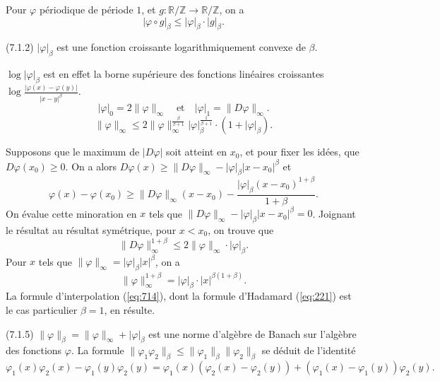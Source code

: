 \documentclass[12pt]{amsart}
\theoremstyle{plain}
\theoremstyle{remark}
\begin{document}
Pour $\varphi$ p\'{e}riodique de p\'{e}riode $1$, et $g : \mathbb{R}/\mathbb{Z} \to \mathbb{R}/\mathbb{Z}$, on a
\begin{equation}\label{eq:711}
|\varphi \circ g|_{\beta} \leq |\varphi|_{\beta} \cdot |g|_{\beta} .
\end{equation}

(7.1.2) $|\varphi|_{\beta}$ est une fonction croissante logarithmiquement convexe de $\beta$.

$\log |\varphi|_{\beta}$ est en effet la borne sup\'{e}rieure des fonctions lin\'{e}aires croissantes $\log \frac{|\varphi(x) - \varphi(y)|}{|x-y|^{\beta}}$.
\begin{equation}\label{eq:713}
|\varphi|_{0} = 2\|\varphi\|_{\infty} \quad \text{et} \quad |\varphi|_{1} = \|D\varphi\|_{\infty} .
\end{equation}
\begin{equation}\label{eq:714}
\|\varphi\|_{\infty} \leq 2\|\varphi\|_{\infty}^{\frac{\beta}{\beta+1}} |\varphi|_{\beta}^{\frac{1}{\beta+1}} \cdot (1 + |\varphi|_{\beta}) .
\end{equation}

Supposons que le maximum de $|D\varphi|$ soit atteint en $x_{0}$, et pour fixer les id\'{e}es, que $D\varphi(x_{0}) \geq 0$. On a alors $D\varphi(x) \geq \|D\varphi\|_{\infty} - |\varphi|_{\beta}|x - x_{0}|^{\beta}$ et
\[
\varphi(x) - \varphi(x_{0}) \geq \|D\varphi\|_{\infty}(x - x_{0}) - \frac{|\varphi|_{\beta}(x - x_{0})^{1+\beta}}{1+\beta} .
\]
On \'{e}value cette minoration en $x$ tels que $\|D\varphi\|_{\infty} - |\varphi|_{\beta}|x - x_{0}|^{\beta} = 0$. Joignant le r\'{e}sultat au r\'{e}sultat sym\'{e}trique, pour $x < x_{0}$, on trouve que
\[
\|D\varphi\|_{\infty}^{1+\beta} \leq 2\|\varphi\|_{\infty} \cdot |\varphi|_{\beta} .
\]
Pour $x$ tels que $\|\varphi\|_{\infty} = |\varphi|_{\beta}|x|^{\beta}$, on a
\[
\|\varphi\|_{\infty}^{1+\beta} = |\varphi|_{\beta} \cdot |x|^{\beta(1+\beta)} .
\]
La formule d'interpolation (\ref{eq:714}), dont la formule d'Hadamard (\ref{eq:221}) est le cas particulier $\beta = 1$, en r\'{e}sulte.

(7.1.5) $\|\varphi\|_{\beta} = \|\varphi\|_{\infty} + |\varphi|_{\beta}$ est une norme d'alg\`{e}bre de Banach sur l'alg\`{e}bre des fonctions $\varphi$. La formule $\|\varphi_{1}\varphi_{2}\|_{\beta} \leq \|\varphi_{1}\|_{\beta}\|\varphi_{2}\|_{\beta}$ se d\'{e}duit de l'identit\'{e}
\[
\varphi_{1}(x)\varphi_{2}(x) - \varphi_{1}(y)\varphi_{2}(y) = \varphi_{1}(x)(\varphi_{2}(x) - \varphi_{2}(y)) + (\varphi_{1}(x) - \varphi_{1}(y))\varphi_{2}(y) .
\]
\end{document}
